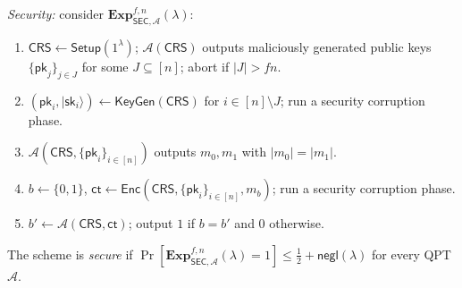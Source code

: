 \documentclass{conjura-conjecture}
\newcommand{\ket}[1]{\lvert #1 \rangle}
\newcommand{\negl}{\mathsf{negl}}
\newcommand{\Setup}{\mathsf{Setup}}
\newcommand{\KeyGen}{\mathsf{KeyGen}}
\newcommand{\Enc}{\mathsf{Enc}}
\newcommand{\CRS}{\mathsf{CRS}}
\newcommand{\pk}{\mathsf{pk}}
\newcommand{\sk}{\mathsf{sk}}
\newcommand{\ct}{\mathsf{ct}}
\begin{document}
\begin{definition}
\emph{Security:} consider $\mathbf{Exp}^{f,n}_{\mathsf{SEC},
\mathcal{A}}(\lambda)$:
\begin{enumerate}[leftmargin=1.6em]
  \item $\CRS \gets \Setup(1^{\lambda})$; $\mathcal{A}(\CRS)$ outputs
    maliciously generated public keys $\{\pk_{j}\}_{j \in J}$ for some
    $J \subseteq [n]$; abort if $\lvert J \rvert > f n$.
  \item $(\pk_{i}, \ket{\sk_{i}}) \gets \KeyGen(\CRS)$ for $i \in [n]
    \setminus J$; run a security corruption phase.
  \item $\mathcal{A}(\CRS, \{\pk_{i}\}_{i \in [n]})$ outputs $m_{0},
    m_{1}$ with $\lvert m_{0} \rvert = \lvert m_{1} \rvert$.
  \item $b \gets \{0,1\}$, $\ct \gets \Enc(\CRS, \{\pk_{i}\}_{i \in
    [n]}, m_{b})$; run a security corruption phase.
  \item $b' \gets \mathcal{A}(\CRS, \ct)$; output $1$ if $b = b'$ and
    $0$ otherwise.
\end{enumerate}
The scheme is \emph{secure} if
$\Pr[\mathbf{Exp}^{f,n}_{\mathsf{SEC}, \mathcal{A}}(\lambda) = 1] \le
\tfrac{1}{2} + \negl(\lambda)$ for every QPT $\mathcal{A}$.


\end{definition}
\end{document}
